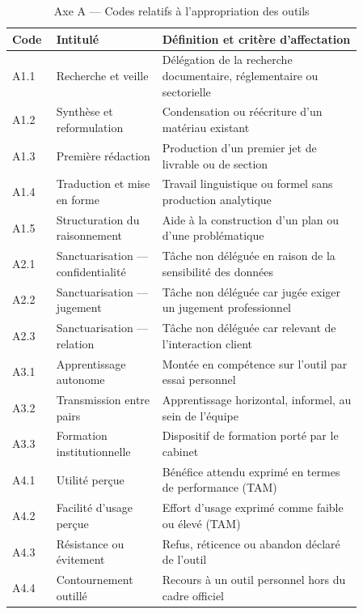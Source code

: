 \begin{table}[h]
\centering
\small
\begin{tabular}{|p{0.08\linewidth}|p{0.27\linewidth}|p{0.51\linewidth}|}
\hline
\textbf{Code} & \textbf{Intitulé} & \textbf{Définition et critère d'affectation} \\
\hline
A1.1 & Recherche et veille & Délégation de la recherche documentaire, réglementaire ou sectorielle \\
\hline
A1.2 & Synthèse et reformulation & Condensation ou réécriture d'un matériau existant \\
\hline
A1.3 & Première rédaction & Production d'un premier jet de livrable ou de section \\
\hline
A1.4 & Traduction et mise en forme & Travail linguistique ou formel sans production analytique \\
\hline
A1.5 & Structuration du raisonnement & Aide à la construction d'un plan ou d'une problématique \\
\hline
A2.1 & Sanctuarisation --- confidentialité & Tâche non déléguée en raison de la sensibilité des données \\
\hline
A2.2 & Sanctuarisation --- jugement & Tâche non déléguée car jugée exiger un jugement professionnel \\
\hline
A2.3 & Sanctuarisation --- relation & Tâche non déléguée car relevant de l'interaction client \\
\hline
A3.1 & Apprentissage autonome & Montée en compétence sur l'outil par essai personnel \\
\hline
A3.2 & Transmission entre pairs & Apprentissage horizontal, informel, au sein de l'équipe \\
\hline
A3.3 & Formation institutionnelle & Dispositif de formation porté par le cabinet \\
\hline
A4.1 & Utilité perçue & Bénéfice attendu exprimé en termes de performance (TAM) \\
\hline
A4.2 & Facilité d'usage perçue & Effort d'usage exprimé comme faible ou élevé (TAM) \\
\hline
A4.3 & Résistance ou évitement & Refus, réticence ou abandon déclaré de l'outil \\
\hline
A4.4 & Contournement outillé & Recours à un outil personnel hors du cadre officiel \\
\hline
\end{tabular}
\caption{Axe A --- Codes relatifs à l'appropriation des outils}
\label{tab:codebook-a}
\end{table}

